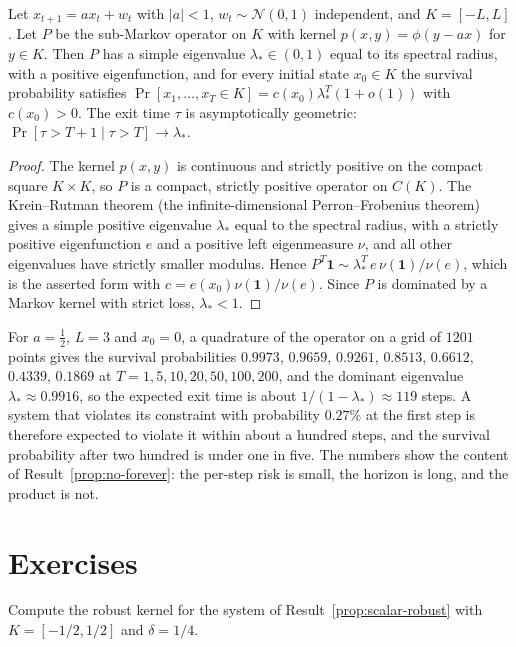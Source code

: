 \begin{newresult}\label{prop:survival}
Let $x_{t+1}=ax_t+w_t$ with $|a|<1$, $w_t\sim\mathcal N(0,1)$ independent, and $K=[-L,L]$. Let $P$ be the sub-Markov operator on $K$ with kernel $p(x,y)=\phi(y-ax)$ for $y\in K$. Then $P$ has a simple eigenvalue $\lambda_*\in(0,1)$ equal to its spectral radius, with a positive eigenfunction, and for every initial state $x_0\in K$ the survival probability satisfies $\Pr[x_1,\dots,x_T\in K]=c(x_0)\lambda_*^{T}(1+o(1))$ with $c(x_0)>0$. The exit time $\tau$ is asymptotically geometric: $\Pr[\tau>T+1\mid\tau>T]\to\lambda_*$.
\end{newresult}
\begin{proof}
The kernel $p(x,y)$ is continuous and strictly positive on the compact square $K\times K$, so $P$ is a compact, strictly positive operator on $C(K)$. The Krein--Rutman theorem (the infinite-dimensional Perron--Frobenius theorem) gives a simple positive eigenvalue $\lambda_*$ equal to the spectral radius, with a strictly positive eigenfunction $e$ and a positive left eigenmeasure $\nu$, and all other eigenvalues have strictly smaller modulus. Hence $P^{T}\mathbf 1\sim\lambda_*^{T}\,e\,\nu(\mathbf 1)/\nu(e)$, which is the asserted form with $c=e(x_0)\nu(\mathbf 1)/\nu(e)$. Since $P$ is dominated by a Markov kernel with strict loss, $\lambda_*<1$.
\end{proof}

For $a=\tfrac12$, $L=3$ and $x_0=0$, a quadrature of the operator on a grid of $1201$ points gives the survival probabilities $0.9973$, $0.9659$, $0.9261$, $0.8513$, $0.6612$, $0.4339$, $0.1869$ at $T=1,5,10,20,50,100,200$, and the dominant eigenvalue $\lambda_*\approx0.9916$, so the expected exit time is about $1/(1-\lambda_*)\approx119$ steps. A system that violates its constraint with probability $0.27\%$ at the first step is therefore expected to violate it within about a hundred steps, and the survival probability after two hundred is under one in five. The numbers show the content of Result~\ref{prop:no-forever}: the per-step risk is small, the horizon is long, and the product is not.

\section*{Exercises}

\begin{exercise}
Compute the robust kernel for the system of Result~\ref{prop:scalar-robust} with $K=[-1/2,1/2]$ and $\delta=1/4$.
\end{exercise}

